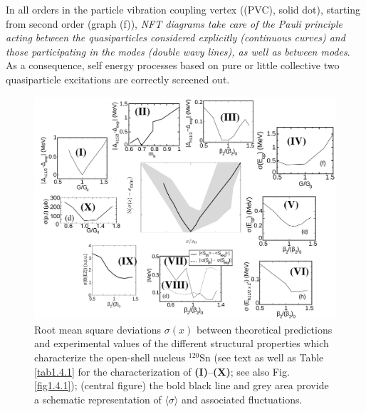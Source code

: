 In all orders in the particle vibration coupling vertex ((PVC), solid dot), starting from second order (graph (f)), \textit{NFT diagrams take care of the  Pauli principle acting between the quasiparticles considered explicitly (continuous curves) and those participating in the modes (double wavy lines), as well as between modes}. As a consequence, self energy processes based on pure or  little collective two quasiparticle excitations are correctly screened out.

\begin{figure}
\begin{center}
\centerline{\includegraphics[width=18cm]{introduccion/figs/funnel_norm_tot_try_v3.pdf}}
\caption{ Root mean square deviations $\sigma(x)$ between theoretical predictions and experimental values of the different structural properties which  characterize the open-shell nucleus $^{120}$Sn (see text as well as Table \ref{tab1.4.1} for the characterization of \textbf{(I)}--\textbf{(X)}; see also Fig. \ref{fig1.4.1}); (central figure) the bold black line and grey area provide a schematic representation of $\langle\sigma\rangle$ and associated fluctuations.}\label{fig1.4.1x}
\end{center}
\end{figure}


